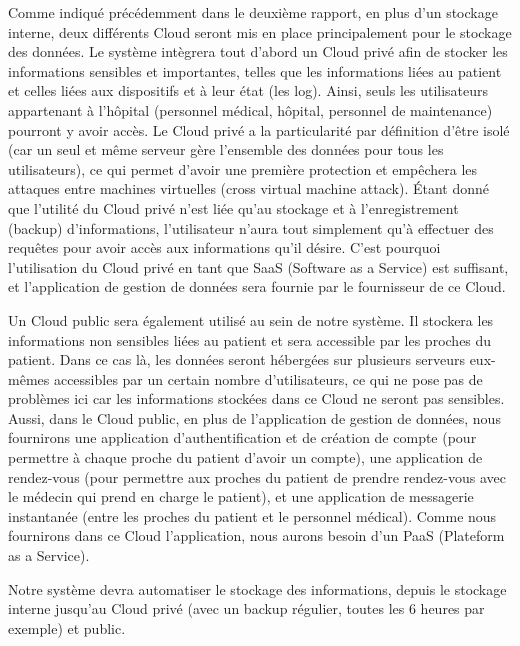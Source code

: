 Comme indiqué précédemment dans le deuxième rapport, en plus d'un stockage interne, deux différents Cloud seront mis en place principalement pour le stockage des données. Le système intègrera tout d'abord un Cloud privé afin de stocker les informations sensibles et importantes, telles que les informations liées au patient et celles liées aux dispositifs et à leur état (les log). Ainsi, seuls les utilisateurs appartenant à l’hôpital (personnel médical, hôpital, personnel de maintenance) pourront y avoir accès. Le Cloud privé a la particularité par définition d'être isolé (car un seul et même serveur gère l’ensemble des données pour tous les utilisateurs), ce qui permet d'avoir une première protection et empêchera les attaques entre machines virtuelles (cross virtual machine attack). Étant donné que l'utilité du Cloud privé n'est liée qu'au stockage et à l'enregistrement (backup) d'informations, l'utilisateur n'aura tout simplement qu'à effectuer des requêtes pour avoir accès aux informations qu'il désire. C'est pourquoi l'utilisation du Cloud privé en tant que SaaS (Software as a Service) est suffisant, et l'application de gestion de données sera fournie par le fournisseur de ce Cloud.

Un Cloud public sera également utilisé au sein de notre système. Il stockera les informations non sensibles liées au patient et sera accessible par les proches du patient. Dans ce cas là, les données seront hébergées sur plusieurs serveurs eux-mêmes accessibles par un certain nombre d’utilisateurs, ce qui ne pose pas de problèmes ici car les informations stockées dans ce Cloud ne seront pas sensibles. Aussi, dans le Cloud public, en plus de l'application de gestion de données, nous fournirons une application d'authentification et de création de compte (pour permettre à chaque proche du patient d'avoir un compte), une application de rendez-vous (pour permettre aux proches du patient de prendre rendez-vous avec le médecin qui prend en charge le patient), et une application de messagerie instantanée (entre les proches du patient et le personnel médical). Comme nous fournirons dans ce Cloud l'application, nous aurons besoin d'un PaaS (Plateform as a Service).

Notre système devra automatiser le stockage des informations, depuis le stockage interne jusqu'au Cloud privé (avec un backup régulier, toutes les 6 heures par exemple) et public.

